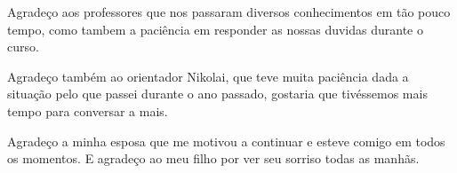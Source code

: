 \begin{agradecimentos}
	Agradeço aos professores que nos passaram diversos conhecimentos em tão pouco tempo, como tambem a paciência em responder as nossas duvidas durante o curso. 
	
	Agradeço também ao orientador Nikolai, que teve muita paciência dada a situação pelo que passei durante o ano passado, gostaria que tivéssemos mais tempo para conversar a mais.

	Agradeço a minha esposa que me motivou a continuar e esteve comigo em todos os momentos. E agradeço ao meu filho por ver seu sorriso todas as manhãs.
\end{agradecimentos}
